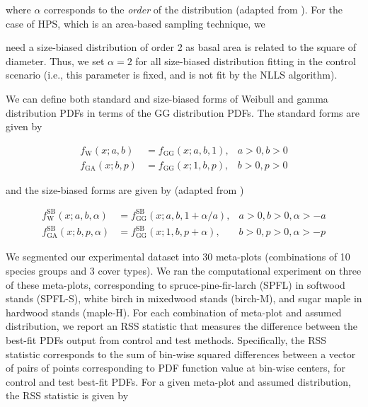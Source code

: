 \message{ !name(hpsdistfit_article.tex)}\documentclass{article}
\begin{document}
where $\alpha$ corresponds to the \emph{order} of the distribution (adapted from \citealp{ducey2015sizebiased}).
For the case of HPS, which is an area-based sampling technique, we

need a size-biased distribution of order 2 as basal area is related to
the square of diameter.
Thus, we set $\alpha=2$ for all size-biased distribution fitting in the control scenario (i.e., this parameter is fixed, and is not fit by the NLLS algorithm).


We can define both standard and size-biased forms
of Weibull and gamma distribution PDFs in terms of the GG distribution
PDFs.
The standard forms are given by


  \begin{align*}
f_{\text{W}}(x; a, b) &= f_{\text{GG}}(x; a, b, 1), & a > 0, b > 0 \\
f_{\text{GA}}(x; b, p) &= f_{\text{GG}}(x; 1, b, p), & b > 0, p > 0
\end{align*}

and the size-biased forms are given by (adapted from \citealp{ducey2015sizebiased})

\begin{align*}
f^{\text{SB}}_{\text{W}}(x; a, b, \alpha) &= f^{\text{SB}}_{\text{GG}}(x; a, b, 1 + \alpha/a),& a > 0, b > 0, \alpha > -a \\
f^{\text{SB}}_{\text{GA}}(x; b, p, \alpha) &= f^{\text{SB}}_{\text{GG}}(x; 1, b, p + \alpha),& b > 0, p > 0, \alpha > -p 
\end{align*}

We segmented our experimental dataset into 30 meta-plots (combinations
of 10 species groups and 3 cover types).
We ran the computational
experiment on three of these meta-plots, corresponding to
spruce-pine-fir-larch (SPFL) in softwood stands (SPFL-S), white birch
in mixedwood stands (birch-M), and sugar maple in hardwood stands
(maple-H).
For each combination of meta-plot and assumed distribution, we report
an RSS statistic that measures the difference between the best-fit
PDFs output from  control and test methods.
Specifically, the RSS statistic corresponds to the sum of bin-wise squared differences
between a vector of pairs of points corresponding to PDF function
value at bin-wise centers, for control and test best-fit
PDFs.
For a given meta-plot and assumed distribution, the RSS statistic is
given by
\end{document}
